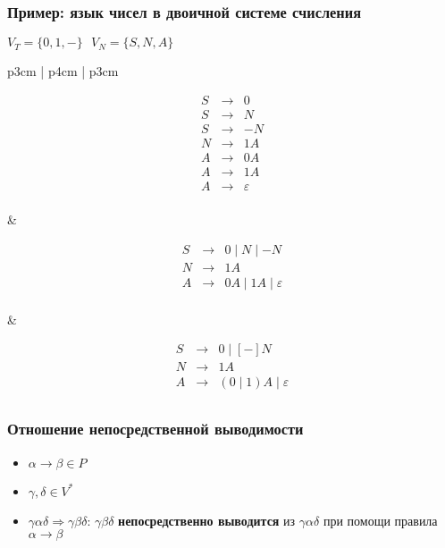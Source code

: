 \documentclass{beamer}
\begin{document}
\begin{frame}[fragile]
  \transwipe[direction=90]
  \frametitle{Пример: язык чисел в двоичной системе счисления}

\begin{center}
  $V_T = \{ 0, 1, - \} \ \ \  V_N = \{ S, N, A \}$
\end{center}

\begin{tabular}{p{3cm} | p{4cm} | p{3cm}}

\[
\begin{array}{rcl}
S& \rightarrow & 0 \\
S& \rightarrow & N \\
S& \rightarrow & - N \\
N& \rightarrow & 1 A \\
A& \rightarrow & 0 A \\
A& \rightarrow & 1 A \\
A& \rightarrow & \varepsilon \\
\end{array}
\]

& \pause

\[
\begin{array}{rcl}
S& \rightarrow & 0 \mid N \mid - N  \\
N& \rightarrow & 1 A \\
A& \rightarrow & 0 A \mid 1 A  \mid \varepsilon\\
\end{array}
\]

& \pause

\[
\begin{array}{rcl}
S& \rightarrow & 0 \mid [-] N  \\
N& \rightarrow & 1 A \\
A& \rightarrow & (0 \mid 1) A  \mid \varepsilon\\
\end{array}
\]

\end{tabular}
\end{frame}

\begin{frame}[fragile]
  \transwipe[direction=90]
  \frametitle{Отношение непосредственной выводимости}
  \begin{itemize}
    \item $\alpha \rightarrow \beta \in P$
    \item $\gamma, \delta \in V^*$
    \item $\gamma \alpha \delta \Rightarrow \gamma \beta \delta$: $\gamma \beta \delta$ \textbf{непосредственно выводится} из $\gamma \alpha \delta$ при помощи правила $\alpha \rightarrow \beta$
  \end{itemize}
\end{frame}
\end{document}
